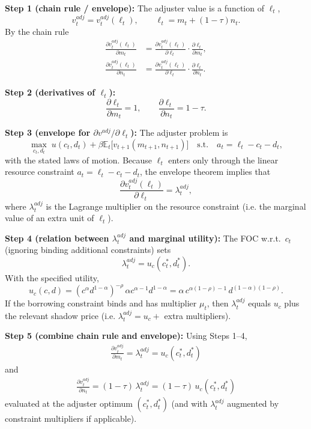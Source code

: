 \textbf{Step 1 (chain rule / envelope):} The adjuster value is a function of \(\ell_t\),
\[
v_t^{adj} = v_t^{adj}(\ell_t),\qquad \ell_t = m_t + (1-\tau)n_t.
\]
By the chain rule
\begin{align}
	\frac{\partial v_t^{adj}(\ell_t)}{\partial m_t}
	&= \frac{\partial v_t^{adj}(\ell_t)}{\partial \ell_t}\cdot\frac{\partial \ell_t}{\partial m_t}, \\
	\frac{\partial v_t^{adj}(\ell_t)}{\partial n_t}
	&= \frac{\partial v_t^{adj}(\ell_t)}{\partial \ell_t}\cdot\frac{\partial \ell_t}{\partial n_t}.
\end{align}

\textbf{Step 2 (derivatives of \(\ell_t\)):}
\[
\frac{\partial\ell_t}{\partial m_t} = 1, \qquad
\frac{\partial\ell_t}{\partial n_t} = 1-\tau.
\]

\textbf{Step 3 (envelope for \(\partial v^{adj}/\partial \ell_t\)):} The adjuster problem is
\[
\max_{c_t,d_t}\; u(c_t,d_t) + \beta\mathbb{E}_t\big[v_{t+1}(m_{t+1},n_{t+1})\big]
\quad\text{s.t.}\quad a_t = \ell_t - c_t - d_t,
\]
with the stated laws of motion. Because \(\ell_t\) enters only through the linear resource constraint \(a_t=\ell_t-c_t-d_t\), the envelope theorem implies that
\[
\frac{\partial v_t^{adj}(\ell_t)}{\partial \ell_t} = \lambda_t^{adj},
\]
where \(\lambda_t^{adj}\) is the Lagrange multiplier on the resource constraint (i.e. the marginal value of an extra unit of \(\ell_t\)).

\textbf{Step 4 (relation between \(\lambda_t^{adj}\) and marginal utility):} The FOC w.r.t.\ \(c_t\) (ignoring binding additional constraints) sets
\[
\lambda_t^{adj} = u_c(c_t^\ast,d_t^\ast).
\]
With the specified utility,
\[
u_c(c,d) = (c^\alpha d^{1-\alpha})^{-\rho}\,\alpha c^{\alpha-1} d^{1-\alpha}
= \alpha\, c^{\alpha(1-\rho)-1}\, d^{(1-\alpha)(1-\rho)}.
\]
If the borrowing constraint binds and has multiplier \(\mu_t\), then
\(\lambda_t^{adj}\) equals \(u_c\) plus the relevant shadow price (i.e. \(\lambda_t^{adj}=u_c+\) extra multipliers).

\textbf{Step 5 (combine chain rule and envelope):} Using Steps 1--4,
\begin{align}
		\frac{\partial v_t^{adj}}{\partial m_t}
		= \lambda_t^{adj}
		= u_c(c_t^\ast,d_t^\ast)
\label{eq:adj_m_basic}
\end{align}
and
\begin{align}
		\frac{\partial v_t^{adj}}{\partial n_t}
		= (1-\tau)\,\lambda_t^{adj}
		= (1-\tau)\,u_c(c_t^\ast,d_t^\ast)
\label{eq:adj_n_basic}
\end{align}
evaluated at the adjuster optimum \((c_t^\ast,d_t^\ast)\) (and with \(\lambda_t^{adj}\) augmented by constraint multipliers if applicable).

